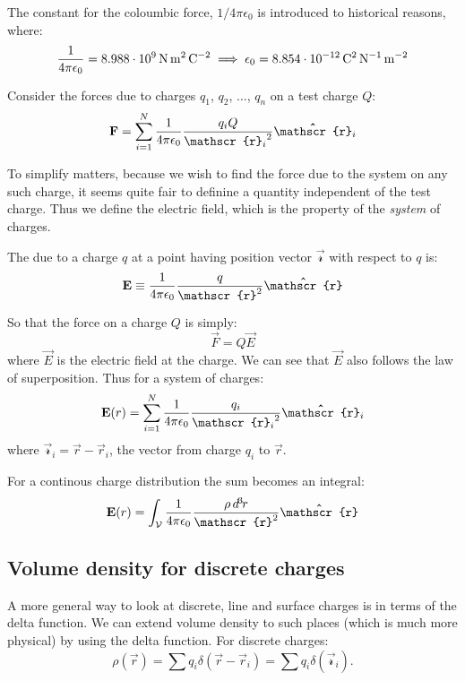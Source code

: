 The constant for the coloumbic force, $1/4\pi\epsilon_0$ is introduced to historical reasons, where:
\[
\frac{1}{4\pi\epsilon_0} = 8.988 \cdot 10^9 \, \unit{\N\metre\squared\per\C\squared} \implies 
\epsilon_0 = 8.854 \cdot 10^{-12} \, \unit{\C\squared\per\N\per\metre\squared}
\]

Consider the forces due to charges $q_1$, $q_2$, $\ldots$, $q_n$ on a test charge $Q$:
\[
\vec{F} = \sum_{i = 1}^{N} \frac{1}{4\pi\epsilon_0}  \frac{q_i Q}{{\mathscr{r}_i}^2} \uvec{\mathscr{r}}_i
\]

To simplify matters, because we wish to find the force due to the system on any such charge, it seems quite 
fair to definine a quantity independent of the test charge. Thus we define the electric field, 
which is the property of the \emph{system} of charges.

\begin{definition}
    The  due to a charge $q$ at a point having position vector $\vec{\mathscr{r}}$ with
    respect to $q$ is:
    \begin{equation}
        \vec{E} \equiv \frac{1}{4\pi\epsilon_0} \frac{q}{\mathscr{r}^2}\uvec{\mathscr{r}}
    \end{equation}
\end{definition}

So that the force on a charge $Q$ is simply:
\[
\vec{F} = Q\vec{E}
\]
where $\vec{E}$ is the electric field at the charge. We can see that $\vec{E}$ 
also follows the law of superposition. Thus for a system of charges:
\[
\vec{E}(r) = \sum_{i = 1}^{N} \frac{1}{4\pi\epsilon_0}  \frac{q_i}{{\mathscr{r}_i}^2} \uvec{\mathscr{r}}_i
\]
where $\vec{\mathscr{r}}_i = \vec{r} - \vec{r}_i$, the vector from charge $q_i$ to $\vec{r}$.

For a continous charge distribution the sum becomes an integral:
\[
\vec{E}(r) = \int_{\mathcal{V}} \frac{1}{4\pi\epsilon_0} \frac{\rho \dd[3]{r}}{{\mathscr{r}}^2} \uvec{\mathscr{r}}
\]


\subsection{Volume density for discrete charges}

A more general way  to look at discrete, line and surface charges is in terms of the delta function.
We can extend volume density to such places (which is much more physical) by using the delta function.
For discrete charges:
\[
\rho(\vec{r}) = \sum q_i \delta(\vec{r} - \vec{r}_i) = \sum q_i \delta(\vec{\mathscr{r}}_i).
\]


